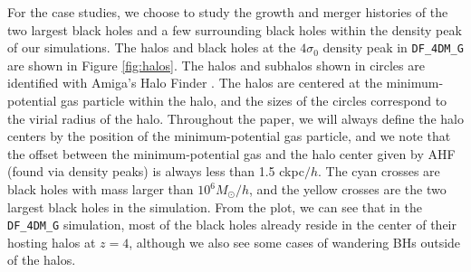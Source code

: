 For the case studies, we choose to study the growth and merger histories of the two largest black holes and a few surrounding black holes within the density peak of our simulations. The halos and black holes at the $4\sigma_0$ density peak in \texttt{DF\_4DM\_G} are shown in Figure \ref{fig:halos}. The halos and subhalos shown in circles are identified with Amiga's Halo Finder \citep[AHF,][]{Knollmann2009}. The halos are centered at the minimum-potential gas particle within the halo, and the sizes of the circles correspond to the virial radius of the halo. Throughout the paper, we will always define the halo centers by the position of the minimum-potential gas particle, and we note that the offset between the minimum-potential gas and the halo center given by AHF (found via density peaks) is always less than 1.5 ckpc$/h$. The cyan crosses are black holes with mass larger than $10^6 M_\odot/h$, and the yellow crosses are the two largest black holes in the simulation. From the plot, we can see that in the \texttt{DF\_4DM\_G} simulation, most of the black holes already reside in the center of their hosting halos at $z=4$, although we also see some cases of wandering BHs outside of the halos.





